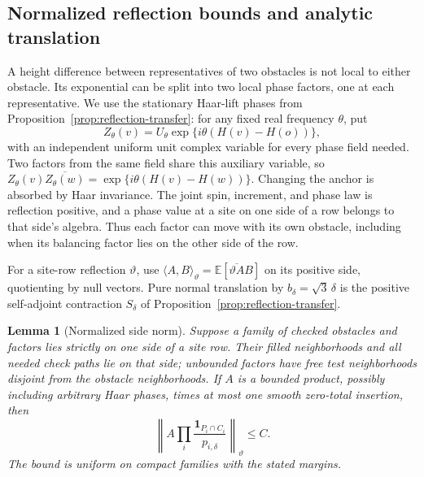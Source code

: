 \documentclass[11pt]{article}
\newcommand{\E}{\mathbb E}
\newcommand{\ind}{\mathbf 1}
\newtheorem{lemma}[theorem]{Lemma}
\theoremstyle{definition}
\theoremstyle{remark}
\numberwithin{equation}{section}
\begin{document}
\subsection{Normalized reflection bounds and analytic translation}

A height difference between representatives of two obstacles is not
local to either obstacle.  Its exponential can be split into two local
phase factors, one at each representative.  We use the stationary
Haar-lift phases from Proposition~\ref{prop:reflection-transfer}: for any
fixed real frequency $\theta$, put
\begin{equation}\label{pins:haar-phase}
 Z_\theta(v)=U_\theta\exp\{i\theta(H(v)-H(o))\},
\end{equation}
with an independent uniform unit complex variable for every phase field
needed.  Two factors from the same field share this auxiliary variable,
so
$Z_\theta(v)\overline{Z_\theta(w)}
=\exp\{i\theta(H(v)-H(w))\}$.
Changing the anchor is absorbed by Haar invariance.  The joint spin,
increment, and phase law is reflection positive, and a phase value at a
site on one side of a row belongs to that side's algebra.  Thus each
factor can move with its own obstacle, including when its balancing
factor lies on the other side of the row.

For a site-row reflection $\vartheta$, use
$\langle A,B\rangle_\vartheta=\E[\overline{\vartheta A}B]$ on its
positive side, quotienting by null vectors.  Pure normal translation
by $b_\delta=\sqrt3\,\delta$ is the positive self-adjoint contraction
$S_\delta$ of Proposition~\ref{prop:reflection-transfer}.

\begin{lemma}[Normalized side norm]\label{pins:side-norm}
Suppose a family of checked obstacles and factors lies strictly on one
side of a site row.  Their filled neighborhoods and all needed check
paths lie on that side; unbounded factors have free test neighborhoods
disjoint from the obstacle neighborhoods.  If $A$ is a bounded product,
possibly including arbitrary Haar phases, times at most one smooth
zero-total insertion, then
\begin{equation}\label{pins:normalized-side-bound}
 \left\|A\prod_i\frac{\ind_{P_i\cap C_i}}{p_{i,\delta}}
       \right\|_\vartheta\le C.
\end{equation}
The bound is uniform on compact families with the stated margins.
\end{lemma}
\end{document}
